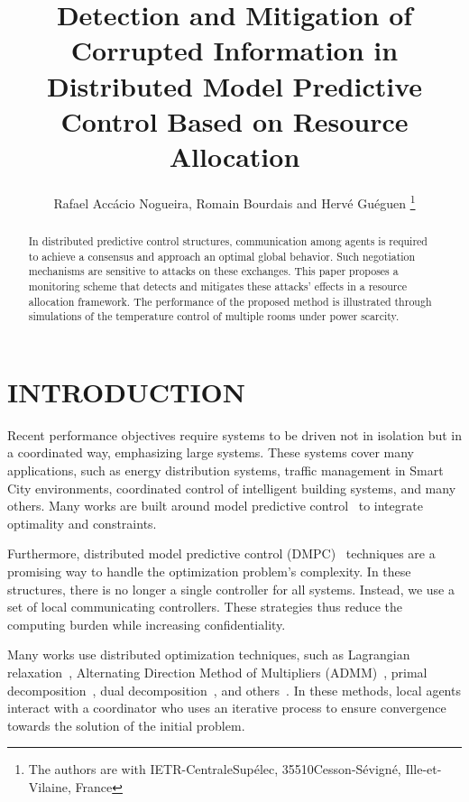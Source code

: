 \documentclass[a4paper, 10 pt, conference]{ieeeconf}  %
\title{\LARGE \bf
Detection and Mitigation of Corrupted Information in Distributed Model Predictive Control Based on Resource Allocation
}
\author{Rafael Accácio Nogueira, Romain Bourdais and Hervé Guéguen
\thanks{The authors are with IETR-CentraleSupélec, 35510\newline Cesson-Sévigné, Ille-et-Vilaine, France \newline {\tt\small
\{rafael-accacio.nogueira, romain.bourdais, herve.gueguen\}
@centralesupelec.fr}\newline
}%
}
\begin{document}
\maketitle
\thispagestyle{empty}
\pagestyle{empty}

\begin{abstract}
  In distributed predictive control structures, communication among agents is required to achieve a consensus and approach an optimal global behavior. Such negotiation mechanisms are sensitive to attacks on these exchanges.
  This paper proposes a monitoring scheme that detects and mitigates these attacks' effects in a resource allocation framework.
  The performance of the proposed method is illustrated through simulations of the temperature control of multiple rooms under power scarcity.
\end{abstract}

\section{INTRODUCTION}
Recent performance objectives require systems to be driven not in isolation but
in a coordinated way, emphasizing large systems.
These systems cover many applications, such as energy distribution systems,
traffic management in Smart City environments, coordinated control of
intelligent building systems, and many others.
Many works are built around model predictive control~\cite{CamachoBordons2007} to integrate optimality and constraints.

Furthermore, distributed model predictive control (DMPC)~\cite{MaestreEtAl2014}
techniques are a promising way to handle the optimization problem's complexity.
In these structures, there is no longer a single controller for all systems.
Instead, we use a set of local communicating controllers.
These strategies thus reduce the computing burden while increasing
confidentiality.

Many works use distributed optimization techniques, such as
Lagrangian relaxation~\cite{BourdaisEtAl2012}, Alternating Direction Method of
Multipliers (ADMM)~\cite{BoydEtAl2011}, primal
decomposition~\cite{PaulenEtAl2016}, dual decomposition~\cite{VelardeEtAl2017,VelardeEtAl2017a,PflaumEtAl2014}, and others~\cite{ChanfreutEtAl2018,Cohen1978}.
In these methods, local agents interact with a coordinator who uses an iterative process to ensure convergence towards the solution of the initial
problem.
\end{document}

